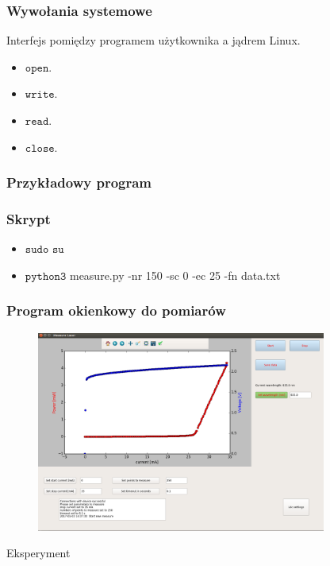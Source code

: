 \documentclass[xcolor={dvipsnames,table}]{beamer}
\begin{document}
\begin{frame}
\frametitle{Wywołania systemowe}
Interfejs pomiędzy programem użytkownika a jądrem Linux.
\begin{itemize}
\item $\mathtt{open}$.
\item $\mathtt{write}$.
\item $\mathtt{read}$.
\item $\mathtt{close}$.
\end{itemize}
\end{frame}

\begin{frame}
\frametitle{Przykładowy program}

\end{frame}

\begin{frame}
\frametitle{Skrypt}
\begin{itemize}
\item $\mathtt{sudo}$ $\mathtt{su}$
\item $\mathtt{python3}$ measure.py -nr 150 -sc 0 -ec 25 -fn data.txt

\end{itemize}
\end{frame}

\begin{frame}
\frametitle{Program okienkowy do pomiarów}
\begin{figure}
   \includegraphics[width=0.85\textwidth,natwidth=69,natheight=87]{gui.png}
\end{figure}
\end{frame}

\begin{frame}
\begin{Huge}
\begin{center}
Eksperyment
\end{center}
\end{Huge}
\end{frame}
\end{document}
